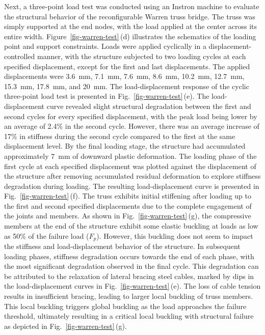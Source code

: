 Next, a three-point load test was conducted using an Instron machine to evaluate the structural behavior of the reconfigurable Warren truss bridge. The truss was simply supported at the end nodes, with the load applied at the center across its entire width. Figure~\ref{fig-warren-test}\,(d) illustrates the schematics of the loading point and support constraints. Loads were applied cyclically in a displacement-controlled manner, with the structure subjected to two loading cycles at each specified displacement, except for the first and last displacements. The applied displacements were 3.6~mm, 7.1~mm, 7.6~mm, 8.6~mm, 10.2~mm, 12.7~mm, 15.3~mm, 17.8~mm, and 20~mm. The load-displacement response of the cyclic three-point load test is presented in Fig.~\ref{fig-warren-test}\,(e). The load-displacement curve revealed slight structural degradation between the first and second cycles for every specified displacement, with the peak load being lower by an average of 2.4\% in the second cycle. However, there was an average increase of 17\% in stiffness during the second cycle compared to the first at the same displacement level. By the final loading stage, the structure had accumulated approximately 7~mm of downward plastic deformation. The loading phase of the first cycle at each specified displacement was plotted against the displacement of the structure after removing accumulated residual deformation to explore stiffness degradation during loading. The resulting load-displacement curve is presented in Fig.~\ref{fig-warren-test}\,(f). The truss exhibits initial stiffening after loading up to the first and second specified displacements due to the complete engagement of the joints and members. As shown in Fig.~\ref{fig-warren-test}\,(g), the compressive members at the end of the structure exhibit some elastic buckling at loads as low as 50\% of the failure load (\(F_p\)). However, this buckling does not seem to impact the stiffness and load-displacement behavior of the structure. In subsequent loading phases, stiffness degradation occurs towards the end of each phase, with the most significant degradation observed in the final cycle. This degradation can be attributed to the relaxation of lateral bracing steel cables, marked by dips in the load-displacement curves in Fig.~\ref{fig-warren-test}\,(e). The loss of cable tension results in insufficient bracing, leading to larger local buckling of truss members. This local buckling triggers global buckling as the load approaches the failure threshold, ultimately resulting in a critical local buckling with structural failure as depicted in Fig.~\ref{fig-warren-test}\,(g).


